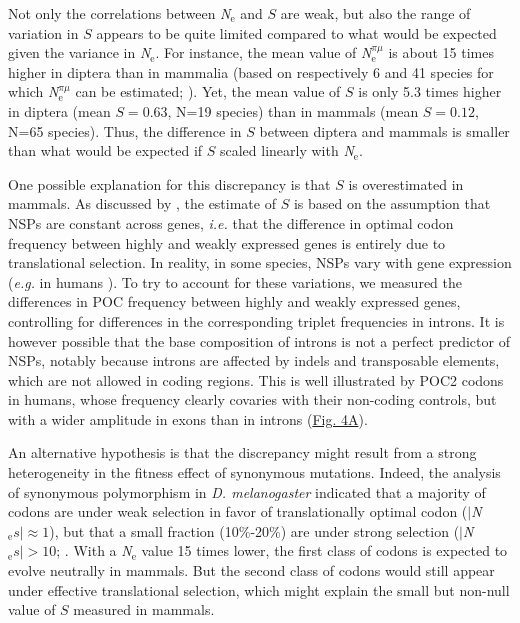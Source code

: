 Not only the correlations between \textit{N}$_{\text{e}}$ and $S$ are weak, but also the range of variation in $S$ appears to be quite limited compared to what would be expected given the variance in \textit{N}$_{\text{e}}$.
For instance, the mean value of \textit{N}$_{\text{e}}^{\pi\mu}$ is about 15 times higher in diptera than in mammalia (based on respectively 6 and 41 species for which \textit{N}$_{\text{e}}^{\pi\mu}$ can be estimated; \citet{lynch_divergence_2023}). Yet, the mean value of $S$ is only 5.3 times higher in diptera (mean $S=0.63$, N=19 species) than in mammals (mean $S=0.12$, N=65 species). Thus, the difference in $S$ between diptera and mammals is smaller than what would be expected if $S$ scaled linearly with \textit{N}$_{\text{e}}$.

One possible explanation for this discrepancy is that $S$ is overestimated in mammals. As discussed by \citet{dos_reis_estimating_2009}, the estimate of $S$ is based on the assumption that NSPs are constant across genes, \textit{i.e.} that the difference in optimal codon frequency between highly and weakly expressed genes is entirely due to translational selection. In reality, in some species, NSPs vary with gene expression (\textit{e.g.} in humans \citet{pouyet_recombination_2017}). To try to account for these variations, we measured the differences in POC frequency between highly and weakly expressed genes, controlling for differences in the corresponding triplet frequencies in introns. It is however possible that the base composition of introns is not a perfect predictor of NSPs, notably because introns are affected by indels and transposable elements, which are not allowed in coding regions. This is well illustrated by POC2 codons in humans, whose frequency clearly covaries with their non-coding controls, but with a wider amplitude in exons than in introns (\hyperref[fig:CU4]{Fig. 4A}).

An alternative hypothesis is that the discrepancy might result from a strong heterogeneity in the fitness effect of synonymous mutations. Indeed, the analysis of synonymous polymorphism in \textit{D. melanogaster} indicated that a majority of codons are under weak selection in favor of translationally optimal codon ($|$\textit{N}$_{\text{e}} s|\approx1$), but that a small fraction (10\%-20\%) are under strong selection ($|$\textit{N}$_{\text{e}} s|>10$; \citet{machado_pervasive_2020}. With a \textit{N}$_{\text{e}}$ value 15 times lower, the first class of codons is expected to evolve neutrally in mammals. But the second class of codons would still appear under effective translational selection, which might explain the small but non-null value of $S$ measured in mammals.

